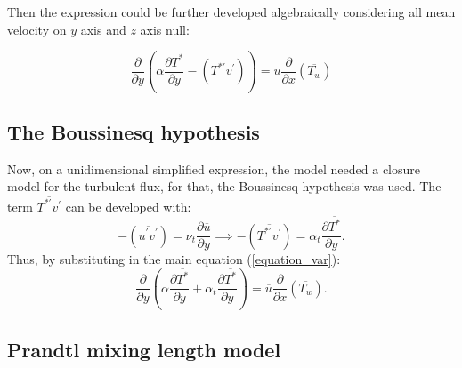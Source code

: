 \documentclass[10pt]{article} %
\begin{document}
Then the expression could be further developed algebraically considering all mean velocity on $y$ axis and $z$ axis null:

\begin{equation}\label{equation_var}
{\frac{\partial{}}{\partial{y}}} \left(\alpha {\frac{\partial{\overline{T^\ast}}}{\partial{y}}}   
- \left(\overline{ T^{\ast\prime} v^\prime}\right) \right)
= 
\overline{u}\frac{\partial{}}{\partial{x}}\left(\overline{T_w}\right)  
\end{equation}



\subsection{The Boussinesq hypothesis}

Now, on a unidimensional simplified expression, the model needed a closure model for the turbulent flux, for that, the Boussinesq hypothesis was used. The term $\overline{T^{\ast\prime}  v^\prime}$ 
can be developed with:
\begin{equation}\label{bou}
-\left(\overline{ u^\prime  v^\prime}\right) = 
\nu_t \frac{\partial{\overline{u}}}{\partial{y}}
\implies
-\left(\overline{ T^{\ast\prime}  v^\prime}\right) = 
\alpha_t \frac{\partial{\overline{T^\ast}}}{\partial{y}}.
\end{equation}
Thus, by substituting in the main equation (\ref{equation_var}):
\\
\begin{equation}
{\frac{\partial{}}{\partial{y}}} \left(\alpha {\frac{\partial{\overline{T^\ast}}}{\partial{y}}}   
+ \alpha_t  \frac{\partial \overline{T^\ast}}{\partial y} \right)
= 
\overline{u}\frac{\partial{}}{\partial{x}}\left(\overline{T_w}\right) . 
\end{equation}

\subsection{Prandtl mixing length model} 
\end{document}
